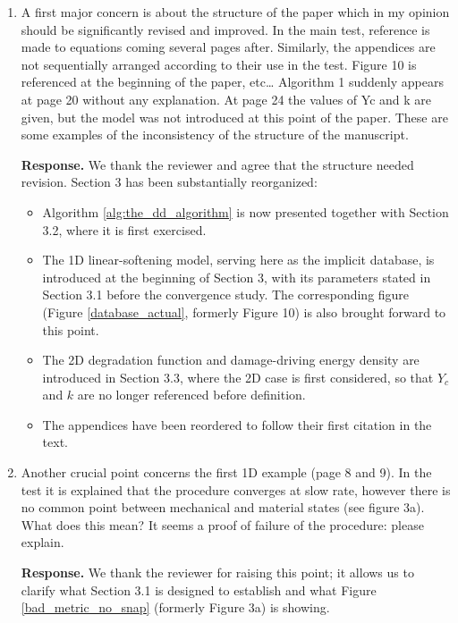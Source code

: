 \documentclass[10pt]{article}
\begin{document}
\color{black}



\begin{enumerate}
\item A first major concern is about the structure of the paper which in my opinion should be significantly revised and improved. In the main test, reference is made to equations coming several pages after. Similarly, the appendices are not sequentially arranged according to their use in the test. Figure 10 is referenced at the beginning of the paper, etc… Algorithm 1 suddenly appears at page 20 without any explanation. At page 24 the values of Yc and k are given, but the model was not introduced at this point of the paper. These are some examples of the inconsistency of the structure of the manuscript.

\color{blue}
\textbf{Response.} We thank the reviewer and agree that the structure
needed revision. Section 3 has been substantially reorganized:
\begin{itemize}
	\item Algorithm \ref{alg:the_dd_algorithm} is now presented together with Section 3.2, where it is first exercised.
	\item The 1D linear-softening model, serving here as the implicit database, is introduced at the beginning of Section 3, with its parameters stated in Section 3.1 before the convergence study. The corresponding figure (Figure \ref{database_actual}, formerly Figure 10) is also brought forward to this point.
	\item The 2D degradation function and damage-driving energy density are introduced in Section 3.3, where the 2D case is first considered,	so that $Y_c$ and $k$ are no longer referenced before definition.
	\item The appendices have been reordered to follow their first citation in the text.
\end{itemize}

\color{black}
\item Another crucial point concerns the first 1D example (page 8 and 9). In the test it is explained that the procedure converges at slow rate, however there is no common point between mechanical and material states (see figure 3a). What does this mean? It seems a proof of failure of the procedure: please explain.

\color{blue}
\textbf{Response.} We thank the reviewer for raising this point; it allows us to clarify what Section 3.1 is designed to establish and what Figure \ref{bad_metric_no_snap} (formerly Figure 3a) is showing.


\end{enumerate}
\end{document}
